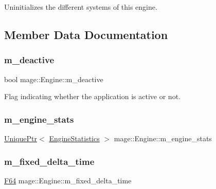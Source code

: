 Uninitializes the different systems of this engine. 

\subsection{Member Data Documentation}
\hypertarget{classmage_1_1_engine_ab8a4b0157403708ae7d1d018a95b4c63}{}\label{classmage_1_1_engine_ab8a4b0157403708ae7d1d018a95b4c63} 
\subsubsection{\texorpdfstring{m\+\_\+deactive}{m\_deactive}}
{\footnotesize\ttfamily bool mage\+::\+Engine\+::m\+\_\+deactive\hspace{0.3cm}{\ttfamily [private]}}

Flag indicating whether the application is active or not. \hypertarget{classmage_1_1_engine_aa0c82f248a2fbec3fbf778665a440edc}{}\label{classmage_1_1_engine_aa0c82f248a2fbec3fbf778665a440edc} 
\subsubsection{\texorpdfstring{m\+\_\+engine\+\_\+stats}{m\_engine\_stats}}
{\footnotesize\ttfamily \hyperlink{namespacemage_a3316d7143a973e37adf1110f2e80ca31}{Unique\+Ptr}$<$ \hyperlink{structmage_1_1_engine_statistics}{Engine\+Statistics} $>$ mage\+::\+Engine\+::m\+\_\+engine\+\_\+stats\hspace{0.3cm}{\ttfamily [private]}}

\hypertarget{classmage_1_1_engine_a95557e1b6cba52b393c94d80d80bea4c}{}\label{classmage_1_1_engine_a95557e1b6cba52b393c94d80d80bea4c} 
\subsubsection{\texorpdfstring{m\+\_\+fixed\+\_\+delta\+\_\+time}{m\_fixed\_delta\_time}}
{\footnotesize\ttfamily \hyperlink{namespacemage_ad26233bbec640deda836e572c1a23708}{F64} mage\+::\+Engine\+::m\+\_\+fixed\+\_\+delta\+\_\+time\hspace{0.3cm}{\ttfamily [private]}}

